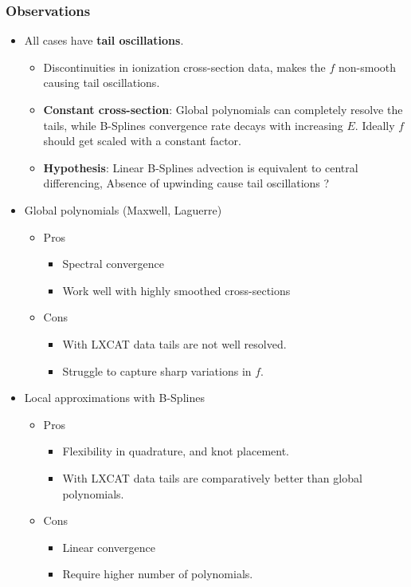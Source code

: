 \documentclass[mathserif, aspectratio=169]{beamer}
\begin{document}
\begin{frame}
	\frametitle{Observations}
	\begin{itemize}
		\item All cases have \textbf{tail oscillations}. %
		\begin{itemize}
			\item Discontinuities in ionization cross-section data, makes the $f$ non-smooth causing tail oscillations.
			\item \textbf{Constant cross-section}: Global polynomials can completely resolve the tails, while B-Splines convergence rate decays with increasing $E$. Ideally $f$ should get scaled with a constant factor. 
			\item \textbf{Hypothesis}: Linear B-Splines advection is equivalent to central differencing, Absence of upwinding cause tail oscillations ?
		\end{itemize}
		\item Global polynomials (Maxwell, Laguerre)
		\begin{itemize}
			\item Pros
			\begin{itemize}
				\item Spectral convergence
				\item Work well with highly smoothed cross-sections
			\end{itemize}
			\item Cons
			\begin{itemize}
				\item With LXCAT data tails are not well resolved. 
				\item Struggle to capture sharp variations in $f$.
			\end{itemize}
		\end{itemize}
		\item Local approximations with B-Splines
		\begin{itemize}
			\item Pros
			\begin{itemize}
				\item Flexibility in quadrature, and knot placement. 
				\item With LXCAT data tails are comparatively better than global polynomials. 
			\end{itemize}
			\item Cons
			\begin{itemize}
				\item Linear convergence
				\item Require higher number of polynomials.
			\end{itemize}
		\end{itemize}
	\end{itemize}
\end{frame}
\end{document}
